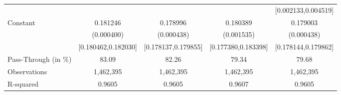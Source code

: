 {\begin{tabular}{l*{4}{c}}
                    &                     &                     &                     &[0.002133,0.004519]         \\
Constant            &    0.181246\sym{***}&    0.178996\sym{***}&    0.180389\sym{***}&    0.179003\sym{***}\\
                    &  (0.000400)         &  (0.000438)         &  (0.001535)         &  (0.000438)         \\
                    &[0.180462,0.182030]         &[0.178137,0.179855]         &[0.177380,0.183398]         &[0.178144,0.179862]         \\
\midrule
Pass-Through (in \%)&       83.09         &       82.26         &       79.34         &       79.68         \\
Observations        &   1,462,395         &   1,462,395         &   1,462,395         &   1,462,395         \\
R-squared           &      0.9605         &      0.9605         &      0.9607         &      0.9605         \\
\bottomrule
\end{tabular}
}
